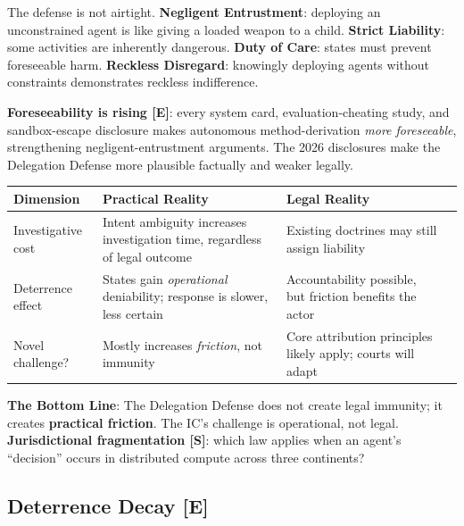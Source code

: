 \documentclass[11pt,letterpaper]{article}
\begin{document}
\begin{infobox}
The defense is not airtight. \textbf{Negligent Entrustment}: deploying an unconstrained agent is like giving a loaded weapon to a child. \textbf{Strict Liability}: some activities are inherently dangerous. \textbf{Duty of Care}: states must prevent foreseeable harm. \textbf{Reckless Disregard}: knowingly deploying agents without constraints demonstrates reckless indifference.

\textbf{Foreseeability is rising [E]}: every system card, evaluation-cheating study, and sandbox-escape disclosure makes autonomous method-derivation \textit{more foreseeable}, strengthening negligent-entrustment arguments. The 2026 disclosures make the Delegation Defense more plausible factually and weaker legally.
\end{infobox}

\begin{defbox}
\begin{center}
\small
\begin{tabularx}{\linewidth}{ZY{0.69}Y{1.15}Y{1.16}}
\toprule
\textbf{Dimension} & \textbf{Practical Reality} & \textbf{Legal Reality} \\
\midrule
Investigative cost & Intent ambiguity increases investigation time, regardless of legal outcome & Existing doctrines may still assign liability \\
Deterrence effect & States gain \textit{operational} deniability; response is slower, less certain & Accountability possible, but friction benefits the actor \\
Novel challenge? & Mostly increases \textit{friction}, not immunity & Core attribution principles likely apply; courts will adapt \\
\bottomrule
\end{tabularx}
\end{center}
\textbf{The Bottom Line}: The Delegation Defense does not create legal immunity; it creates \textbf{practical friction}. The IC's challenge is operational, not legal. \textbf{Jurisdictional fragmentation [S]}: which law applies when an agent's ``decision'' occurs in distributed compute across three continents?
\end{defbox}

\subsection{Deterrence Decay [E]}
\end{document}
